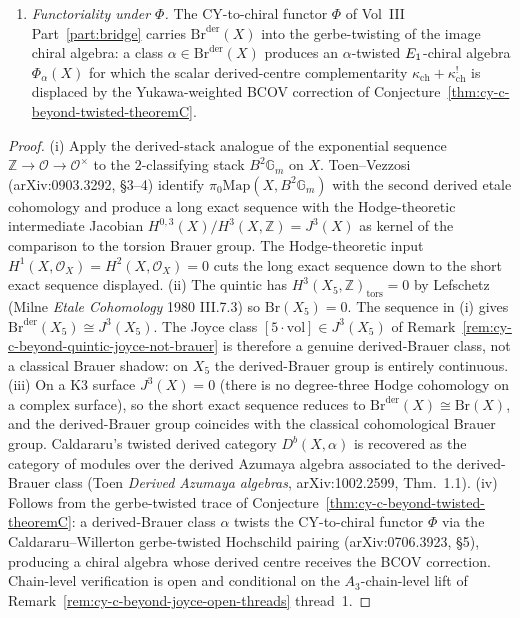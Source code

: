 \begin{conjecture}
\begin{enumerate}
 Brauer group \emph{is} the Brauer group when the continuous part
 vanishes.
 \item[(iv)] \emph{Functoriality under $\Phi$.} The CY-to-chiral
 functor $\Phi$ of Vol~III Part~\ref{part:bridge} carries
 $\mathrm{Br}^{\mathrm{der}}(X)$ into the gerbe-twisting of the image
 chiral algebra: a class $\alpha \in \mathrm{Br}^{\mathrm{der}}(X)$
 produces an $\alpha$-twisted $E_{1}$-chiral algebra $\Phi_\alpha(X)$
 for which the scalar derived-centre complementarity
 $\kappa_{\mathrm{ch}} + \kappa_{\mathrm{ch}}^!$ is displaced by the
 Yukawa-weighted BCOV correction of
 Conjecture~\ref{thm:cy-c-beyond-twisted-theoremC}.
\end{enumerate}
\end{conjecture}

\begin{proof}
(i) Apply the derived-stack analogue of the exponential sequence
$\mathbb{Z} \to \mathcal{O} \to \mathcal{O}^\times$ to the
$2$-classifying stack $B^2 \mathbb{G}_m$ on $X$. Toen--Vezzosi
(arXiv:0903.3292, \S 3--4) identify $\pi_0 \mathrm{Map}(X, B^2
\mathbb{G}_m)$ with the second derived etale cohomology and produce a
long exact sequence with the Hodge-theoretic intermediate Jacobian
$H^{0,3}(X)/H^3(X, \mathbb{Z}) = J^3(X)$ as kernel of the comparison
to the torsion Brauer group. The Hodge-theoretic input
$H^1(X, \mathcal{O}_X) = H^2(X, \mathcal{O}_X) = 0$ cuts the long
exact sequence down to the short exact sequence displayed.
(ii) The quintic has $H^3(X_5, \mathbb{Z})_{\mathrm{tors}} = 0$ by
Lefschetz (Milne \emph{Etale Cohomology} 1980 III.7.3) so
$\mathrm{Br}(X_5) = 0$. The sequence in (i) gives
$\mathrm{Br}^{\mathrm{der}}(X_5) \cong J^3(X_5)$. The Joyce class
$[5 \cdot \mathrm{vol}] \in J^3(X_5)$ of
Remark~\ref{rem:cy-c-beyond-quintic-joyce-not-brauer} is therefore a
genuine derived-Brauer class, not a classical Brauer shadow: on
$X_5$ the derived-Brauer group is entirely continuous.
(iii) On a K3 surface $J^3(X) = 0$ (there is no degree-three Hodge
cohomology on a complex surface), so the short exact sequence reduces
to $\mathrm{Br}^{\mathrm{der}}(X) \cong \mathrm{Br}(X)$, and the
derived-Brauer group coincides with the classical cohomological Brauer
group. Caldararu's twisted derived category
$D^b(X, \alpha)$ is recovered as the category of modules over the
derived Azumaya algebra associated to the derived-Brauer class (Toen
\emph{Derived Azumaya algebras}, arXiv:1002.2599, Thm.~1.1).
(iv) Follows from the gerbe-twisted trace of
Conjecture~\ref{thm:cy-c-beyond-twisted-theoremC}: a derived-Brauer
class $\alpha$ twists the CY-to-chiral functor $\Phi$ via the
Caldararu--Willerton gerbe-twisted Hochschild pairing
(arXiv:0706.3923, \S 5), producing a chiral algebra whose derived
centre receives the BCOV correction. Chain-level verification is open
and conditional on the $A_3$-chain-level lift of
Remark~\ref{rem:cy-c-beyond-joyce-open-threads} thread~1.
\end{proof}

